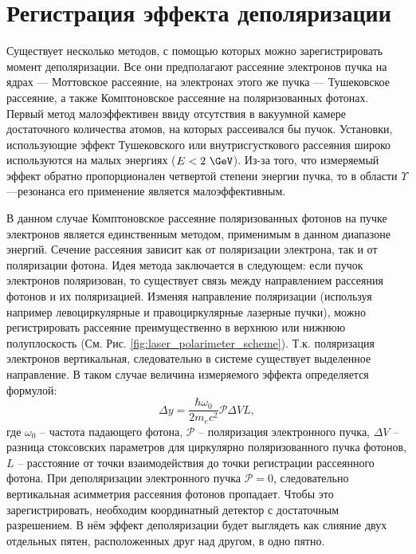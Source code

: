 \section{Регистрация эффекта деполяризации}
Существует несколько методов, с помощью которых можно зарегистрировать момент деполяризации. Все они предполагают рассеяние электронов пучка на ядрах --- Моттовское рассеяние, на электронах этого же пучка --- Тушековское рассеяние, а также Комптоновское рассеяние на поляризованных фотонах. Первый метод малоэффективен ввиду отсутствия в вакуумной камере достаточного количества атомов, на которых рассеивался бы пучок. Установки, использующие эффект Тушековского или внутрисгусткового рассеяния широко используются на малых энергиях ($E < 2~\GeV$). Из-за того, что измеряемый эффект обратно пропорционален четвертой степени энергии пучка, то в области $\Upsilon$---резонанса его применение является малоэффективным.
\par В данном случае Комптоновское рассеяние поляризованных фотонов на пучке электронов является единственным методом, применимым в данном диапазоне энергий. Сечение рассеяния зависит как от поляризации электрона, так и от поляризации фотона. Идея метода заключается в следующем: если пучок электронов поляризован, то существует связь между направлением рассеяния фотонов и их поляризацией. Изменяя направление поляризации (используя например левоциркулярные и правоциркулярные лазерные пучки), можно регистрировать рассеяние преимущественно в верхнюю или нижнюю полуплоскость (См. Рис. \ref{fig:laser_polarimeter_scheme}). Т.к. поляризация электронов вертикальная, следовательно в системе существует выделенное направление. В таком случае величина измеряемого эффекта определяется формулой:
\begin{equation}
	\Delta y = \frac{\hbar \omega_0}{2 m_e c^2} \mathcal{P} \Delta V L,
	\label{eq:pol_effect}
\end{equation}
где $\omega_0$ -- частота падающего фотона, $\mathcal{P}$ -- поляризация электронного пучка, $\Delta V$ -- разница стоксовских параметров для циркулярно поляризованного пучка фотонов, $L$ -- расстояние от точки взаимодействия до точки регистрации рассеянного фотона. При деполяризации электронного пучка $\mathcal{P} = 0$, следовательно вертикальная асимметрия рассеяния фотонов пропадает. Чтобы это зарегистрировать, необходим координатный детектор с достаточным разрешением. В нём эффект деполяризации будет выглядеть как слияние двух отдельных пятен, расположенных друг над другом, в одно пятно.
